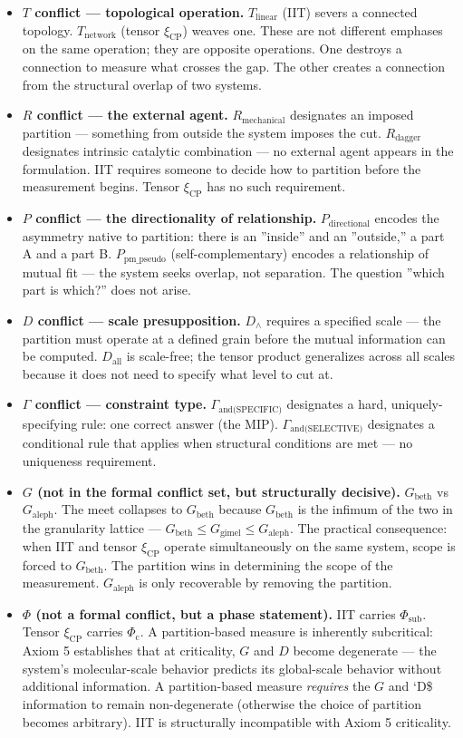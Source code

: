 \documentclass[12pt,a4paper]{article}
\begin{document}
\begin{itemize}
    \item \textbf{$T$ conflict --- topological operation.} $T_\text{linear}$ (IIT) severs a connected topology. $T_\text{network}$ (tensor $\xi_\text{CP}$) weaves one. These are not different emphases on the same operation; they are opposite operations. One destroys a connection to measure what crosses the gap. The other creates a connection from the structural overlap of two systems.
    \item \textbf{$R$ conflict --- the external agent.} $R_\text{mechanical}$ designates an imposed partition --- something from outside the system imposes the cut. $R_\text{dagger}$ designates intrinsic catalytic combination --- no external agent appears in the formulation. IIT requires someone to decide how to partition before the measurement begins. Tensor $\xi_\text{CP}$ has no such requirement.
    \item \textbf{$P$ conflict --- the directionality of relationship.} $P_\text{directional}$ encodes the asymmetry native to partition: there is an ''inside'' and an ''outside,'' a part A and a part B. $P_\text{pm\_pseudo}$ (self-complementary) encodes a relationship of mutual fit --- the system seeks overlap, not separation. The question ''which part is which?'' does not arise.
    \item \textbf{$D$ conflict --- scale presupposition.} $D_\wedge$ requires a specified scale --- the partition must operate at a defined grain before the mutual information can be computed. $D_\text{all}$ is scale-free; the tensor product generalizes across all scales because it does not need to specify what level to cut at.
    \item \textbf{$\Gamma$ conflict --- constraint type.} $\Gamma_\text{and(SPECIFIC)}$ designates a hard, uniquely-specifying rule: one correct answer (the MIP). $\Gamma_\text{and(SELECTIVE)}$ designates a conditional rule that applies when structural conditions are met --- no uniqueness requirement.
    \item \textbf{$G$ (not in the formal conflict set, but structurally decisive).} $G_\text{beth}$ vs $G_\text{aleph}$. The meet collapses to $G_\text{beth}$ because $G_\text{beth}$ is the infimum of the two in the granularity lattice --- $G_\text{beth} \le G_\text{gimel} \le G_\text{aleph}$. The practical consequence: when IIT and tensor $\xi_\text{CP}$ operate simultaneously on the same system, scope is forced to $G_\text{beth}$. The partition wins in determining the scope of the measurement. $G_\text{aleph}$ is only recoverable by removing the partition.
    \item \textbf{$\Phi$ (not a formal conflict, but a phase statement).} IIT carries $\Phi_\text{sub}$. Tensor $\xi_\text{CP}$ carries $\Phi_\text{c}$. A partition-based measure is inherently subcritical: Axiom 5 establishes that at criticality, $G$ and $D$ become degenerate --- the system's molecular-scale behavior predicts its global-scale behavior without additional information. A partition-based measure \emph{requires} the $G$ and `D\$ information to remain non-degenerate (otherwise the choice of partition becomes arbitrary). IIT is structurally incompatible with Axiom 5 criticality.
\end{itemize}
\end{document}
